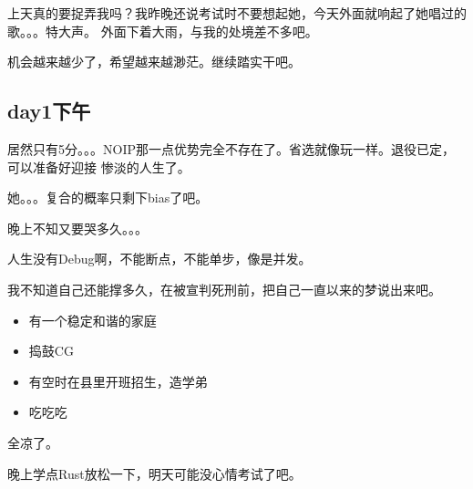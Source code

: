 上天真的要捉弄我吗？我昨晚还说考试时不要想起她，今天外面就响起了她唱过的歌。。。特大声。
外面下着大雨，与我的处境差不多吧。

机会越来越少了，希望越来越渺茫。继续踏实干吧。
\subsection{day1下午}
居然只有5分。。。NOIP那一点优势完全不存在了。省选就像玩一样。退役已定，可以准备好迎接
惨淡的人生了。

她。。。复合的概率只剩下bias了吧。

晚上不知又要哭多久。。。

人生没有Debug啊，不能断点，不能单步，像是并发。

我不知道自己还能撑多久，在被宣判死刑前，把自己一直以来的梦说出来吧。

\begin{itemize}
    \item 有一个稳定和谐的家庭
    \item 捣鼓CG
    \item 有空时在县里开班招生，造学弟
    \item 吃吃吃
\end{itemize}

全凉了。

晚上学点Rust放松一下，明天可能没心情考试了吧。
